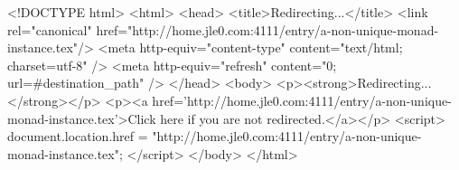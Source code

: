 <!DOCTYPE html>
<html>
<head>
<title>Redirecting...</title>
<link rel="canonical" href="http://home.jle0.com:4111/entry/a-non-unique-monad-instance.tex"/>
<meta http-equiv="content-type" content="text/html; charset=utf-8" />
<meta http-equiv="refresh" content="0; url=#{destination_path}" />
</head>
<body>
  <p><strong>Redirecting...</strong></p>
  <p><a href='http://home.jle0.com:4111/entry/a-non-unique-monad-instance.tex'>Click here if you are not redirected.</a></p>
  <script>
    document.location.href = "http://home.jle0.com:4111/entry/a-non-unique-monad-instance.tex";
  </script>
</body>
</html>
